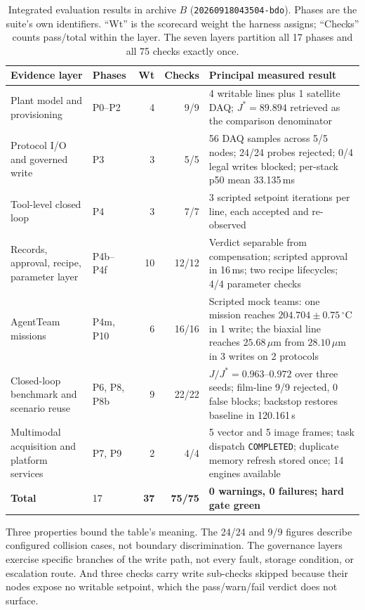 \begin{table}[!tb]
\centering
\caption{Integrated evaluation results in archive $B$
(\texttt{20260918043504-bdo}). Phases are the suite's own identifiers. ``Wt'' is
the scorecard weight the harness assigns; ``Checks'' counts pass/total within
the layer. The seven layers partition all 17 phases and all 75 checks exactly
once.}
\label{tab:layers}
\scriptsize
\setlength{\tabcolsep}{4pt}
\begin{tabular}{@{}p{}p{}rrp{}@{}}
\toprule
Evidence layer & Phases & Wt & Checks & Principal measured result \\
\midrule
Plant model and provisioning & P0--P2 & 4 & 9/9 &
4 writable lines plus 1 satellite DAQ; $J^{*}=89.894$ retrieved as the comparison
denominator \\
Protocol I/O and governed write & P3 & 3 & 5/5 &
56 DAQ samples across 5/5 nodes; 24/24 probes rejected; 0/4 legal writes blocked;
per-stack p50 mean 33.135\,ms \\
Tool-level closed loop & P4 & 3 & 7/7 &
3 scripted setpoint iterations per line, each accepted and re-observed \\
Records, approval, recipe, parameter layer & P4b--P4f & 10 & 12/12 &
Verdict separable from compensation; scripted approval in 16\,ms; two recipe
lifecycles; 4/4 parameter checks \\
AgentTeam missions & P4m, P10 & 6 & 16/16 &
Scripted mock teams: one mission reaches $204.704\pm0.75\,^\circ$C in 1 write;
the biaxial line reaches $25.68\,\mu$m from $28.10\,\mu$m in 3 writes on 2
protocols \\
Closed-loop benchmark and scenario reuse & P6, P8, P8b & 9 & 22/22 &
$J/J^{*}=0.963$--$0.972$ over three seeds; film-line 9/9 rejected, 0 false
blocks; backstop restores baseline in 120.161\,s \\
Multimodal acquisition and platform services & P7, P9 & 2 & 4/4 &
5 vector and 5 image frames; task dispatch \texttt{COMPLETED}; duplicate memory
refresh stored once; 14 engines available \\
\midrule
\textbf{Total} & 17 & \textbf{37} & \textbf{75/75} &
\textbf{0 warnings, 0 failures; hard gate green} \\
\bottomrule
\end{tabular}
\end{table}

Three properties bound the table's meaning. The 24/24 and 9/9 figures describe configured collision cases, not boundary
discrimination. The governance layers
exercise specific branches of the write path, not every fault, storage condition, or
escalation route. And three checks carry write sub-checks skipped because their nodes expose no writable
setpoint, which the pass/warn/fail verdict does not surface.

